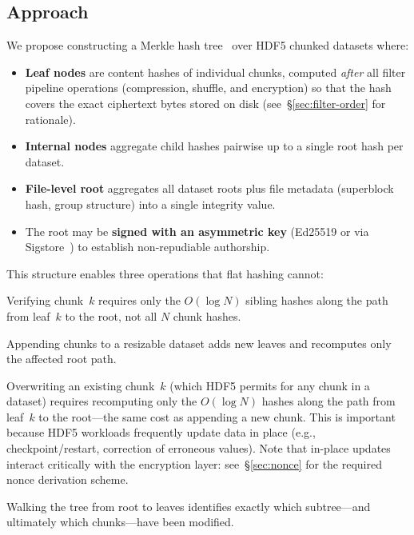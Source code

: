 \documentclass[11pt]{article}
\begin{document}
\subsection{Approach}

We propose constructing a Merkle hash tree~\cite{merkle1987tree} over HDF5
chunked datasets where:

\begin{itemize}[nosep]
  \item \textbf{Leaf nodes} are content hashes of individual chunks, computed
    \emph{after} all filter pipeline operations (compression, shuffle, and
    encryption) so that the hash covers the exact ciphertext bytes stored on
    disk (see~\S\ref{sec:filter-order} for rationale).
  \item \textbf{Internal nodes} aggregate child hashes pairwise up to a single
    root hash per dataset.
  \item \textbf{File-level root} aggregates all dataset roots plus file metadata
    (superblock hash, group structure) into a single integrity value.
  \item The root may be \textbf{signed with an asymmetric key} (Ed25519 or via
    Sigstore~\cite{newman2022sigstore}) to establish non-repudiable
    authorship.
\end{itemize}

\noindent This structure enables three operations that flat hashing cannot:

\begin{description}[nosep]
  \item[Partial verification.] Verifying chunk~$k$ requires only the
    $O(\log N)$ sibling hashes along the path from leaf~$k$ to the root, not
    all $N$ chunk hashes.
  \item[Incremental extension.] Appending chunks to a resizable dataset adds
    new leaves and recomputes only the affected root path.
  \item[In-place update.] Overwriting an existing chunk~$k$ (which HDF5
    permits for any chunk in a dataset) requires recomputing only the
    $O(\log N)$ hashes along the path from leaf~$k$ to the root---the same
    cost as appending a new chunk. This is important because HDF5 workloads
    frequently update data in place (e.g., checkpoint/restart, correction of
    erroneous values). Note that in-place updates interact critically with
    the encryption layer: see~\S\ref{sec:nonce} for the required nonce
    derivation scheme.
  \item[Tamper localization.] Walking the tree from root to leaves identifies
    exactly which subtree---and ultimately which chunks---have been modified.
\end{description}
\end{document}
